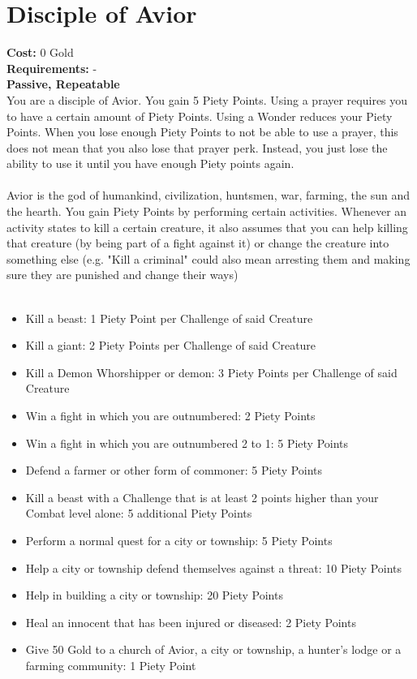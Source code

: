 \section{Disciple of Avior}
\textbf{Cost:} 0 Gold\\
\textbf{Requirements:} - \\
\textbf{Passive, Repeatable}\\
You are a disciple of Avior. You gain 5 Piety Points. Using a prayer requires you to have a certain amount of Piety Points. Using a Wonder reduces your Piety Points. When you lose enough Piety Points to not be able to use a prayer, this does not mean that you also lose that prayer perk. Instead, you just lose the ability to use it until you have enough Piety points again.\\
\\
Avior is the god of humankind, civilization, huntsmen, war, farming, the sun and the hearth. You gain Piety Points by performing certain activities. Whenever an activity states to kill a certain creature, it also assumes that you can help killing that creature (by being part of a fight against it) or change the creature into something else (e.g. "Kill a criminal" could also mean arresting them and making sure they are punished and change their ways)\\
\\
\begin{itemize}
	\item Kill a beast: 1 Piety Point per Challenge of said Creature
	\item Kill a giant: 2 Piety Points per Challenge of said Creature
	\item Kill a Demon Whorshipper or demon: 3 Piety Points per Challenge of said Creature
	\item Win a fight in which you are outnumbered: 2 Piety Points
	\item Win a fight in which you are outnumbered 2 to 1: 5 Piety Points
	\item Defend a farmer or other form of commoner: 5 Piety Points
	\item Kill a beast with a Challenge that is at least 2 points higher than your Combat level alone: 5 additional Piety Points
	\item Perform a normal quest for a city or township: 5 Piety Points
	\item Help a city or township defend themselves against a threat: 10 Piety Points
	\item Help in building a city or township: 20 Piety Points
	\item Heal an innocent that has been injured or diseased: 2 Piety Points
	\item Give 50 Gold to a church of Avior, a city or township, a hunter's lodge or a farming community: 1 Piety Point
\end{itemize}

